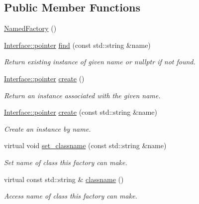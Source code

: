 \subsection*{Public Member Functions}
\begin{DoxyCompactItemize}
\item 
\hyperlink{class_wire_cell_1_1_named_factory_a65b66a089f29b519d4d0146a065a9754}{Named\+Factory} ()
\item 
\hyperlink{class_wire_cell_1_1_interface_a09c548fb8266cfa39afb2e74a4615c37}{Interface\+::pointer} \hyperlink{class_wire_cell_1_1_named_factory_a1c0faed7ba682bd801069997d60ea81b}{find} (const std\+::string \&name)
\begin{DoxyCompactList}\small\item\em Return existing instance of given name or nullptr if not found. \end{DoxyCompactList}\item 
\hyperlink{class_wire_cell_1_1_interface_a09c548fb8266cfa39afb2e74a4615c37}{Interface\+::pointer} \hyperlink{class_wire_cell_1_1_named_factory_a1f5abc7490577953e98a1bfd65671236}{create} ()
\begin{DoxyCompactList}\small\item\em Return an instance associated with the given name. \end{DoxyCompactList}\item 
\hyperlink{class_wire_cell_1_1_interface_a09c548fb8266cfa39afb2e74a4615c37}{Interface\+::pointer} \hyperlink{class_wire_cell_1_1_named_factory_aaf8b55bd335453198f23f412b8174419}{create} (const std\+::string \&name)
\begin{DoxyCompactList}\small\item\em Create an instance by name. \end{DoxyCompactList}\item 
virtual void \hyperlink{class_wire_cell_1_1_named_factory_afd42539ccd3d6f8b49b0afa5b675747b}{set\+\_\+classname} (const std\+::string \&name)
\begin{DoxyCompactList}\small\item\em Set name of class this factory can make. \end{DoxyCompactList}\item 
virtual const std\+::string \& \hyperlink{class_wire_cell_1_1_named_factory_a55b839d7786ecca7b85bcabb7c163daa}{classname} ()
\begin{DoxyCompactList}\small\item\em Access name of class this factory can make. \end{DoxyCompactList}\end{DoxyCompactItemize}


